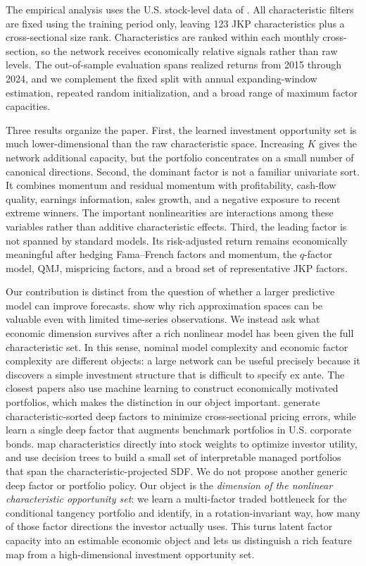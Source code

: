 \documentclass[12pt]{article}
\begin{document}
The empirical analysis uses the U.S. stock-level data of \citet{jensen2023replication}. All characteristic filters are fixed using the training period only, leaving 123 JKP characteristics plus a cross-sectional size rank. Characteristics are ranked within each monthly cross-section, so the network receives economically relative signals rather than raw levels. The out-of-sample evaluation spans realized returns from 2015 through 2024, and we complement the fixed split with annual expanding-window estimation, repeated random initialization, and a broad range of maximum factor capacities.

Three results organize the paper. First, the learned investment opportunity set is much lower-dimensional than the raw characteristic space. Increasing $K$ gives the network additional capacity, but the portfolio concentrates on a small number of canonical directions. Second, the dominant factor is not a familiar univariate sort. It combines momentum and residual momentum with profitability, cash-flow quality, earnings information, sales growth, and a negative exposure to recent extreme winners. The important nonlinearities are interactions among these variables rather than additive characteristic effects. Third, the leading factor is not spanned by standard models. Its risk-adjusted return remains economically meaningful after hedging Fama--French factors and momentum, the $q$-factor model, QMJ, mispricing factors, and a broad set of representative JKP factors.

Our contribution is distinct from the question of whether a larger predictive model can improve forecasts. \citet{kelly2024virtue} show why rich approximation spaces can be valuable even with limited time-series observations. We instead ask what economic dimension survives after a rich nonlinear model has been given the full characteristic set. In this sense, nominal model complexity and economic factor complexity are different objects: a large network can be useful precisely because it discovers a simple investment structure that is difficult to specify ex ante.
The closest papers also use machine learning to construct economically motivated portfolios, which makes the distinction in our object important. \citet{feng2024characteristics} generate characteristic-sorted deep factors to minimize cross-sectional pricing errors, while \citet{feng2026tangency} learn a single deep factor that augments benchmark portfolios in U.S. corporate bonds. \citet{simon2026dppp} map characteristics directly into stock weights to optimize investor utility, and \citet{bryzgalova2025forest} use decision trees to build a small set of interpretable managed portfolios that span the characteristic-projected SDF. We do not propose another generic deep factor or portfolio policy. Our object is the \emph{dimension of the nonlinear characteristic opportunity set}: we learn a multi-factor traded bottleneck for the conditional tangency portfolio and identify, in a rotation-invariant way, how many of those factor directions the investor actually uses. This turns latent factor capacity into an estimable economic object and lets us distinguish a rich feature map from a high-dimensional investment opportunity set.
\end{document}
